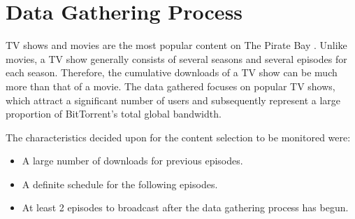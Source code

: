 \documentclass[conference]{IEEEtran}
\begin{document}
\section{Data Gathering Process}
\label{investigationdesign}

TV shows and movies are the most popular content on The Pirate Bay \cite{tpb}. Unlike movies, a TV show generally consists of several seasons and several episodes for each season. Therefore, the cumulative downloads of a TV show can be much more than that of a movie. The data gathered focuses on popular TV shows, which attract a significant number of users and subsequently represent a large proportion of BitTorrent's total global bandwidth.

The characteristics decided upon for the content selection to be monitored were:
\begin{itemize}
\item A large number of downloads for previous episodes.
\item A definite schedule for the following episodes.
\item At least 2 episodes to broadcast after the data gathering process has begun.
\end{itemize}
\end{document}
